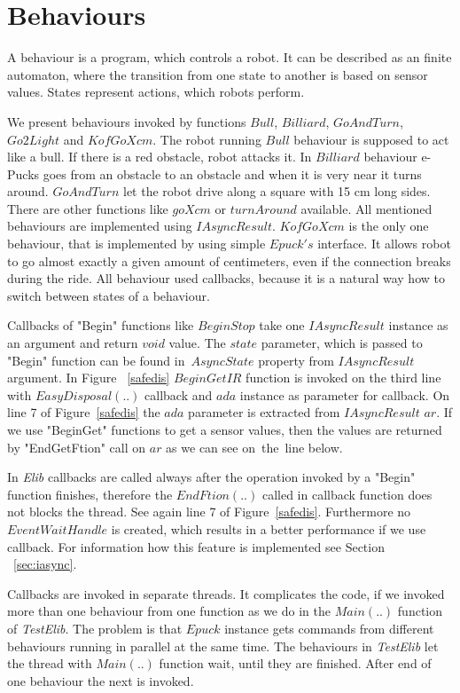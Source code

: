 \section{Behaviours} \label{sec:behaviours}
  A behaviour is a program, which controls a robot. It can be described as an finite automaton, 
  where the transition from one state to another is based on sensor values.
  States represent actions, which robots perform.
  
  We present behaviours invoked by functions $Bull$, $Billiard$, $GoAndTurn$, $Go2Light$ and $KofGoXcm$.
  The robot running $Bull$ behaviour is supposed to act like a bull. 
  If there is a red obstacle, robot attacks it. 
  In $Billiard$ behaviour e-Pucks goes from an obstacle to an obstacle
  and when it is very near it turns around.
  $GoAndTurn$ let the robot drive along a square with 15 cm long sides. 
  There are other functions like $goXcm$ or $turnAround$ available.
  All mentioned behaviours are implemented using $IAsyncResult$. 
  $KofGoXcm$ is the only one behaviour, that is implemented by using simple $Epuck's$ interface.
  It allows robot to go almost exactly a given amount of centimeters, even if the connection breaks during the ride.
  All behaviour used  callbacks, because it is a natural way how to switch between states of a behaviour.

  Callbacks of "Begin" functions like $BeginStop$ take one $IAsyncResult$ instance as an argument and return $void$ value.
  The $state$ parameter, which is passed to "Begin" function can be found 
  in~$AsyncState$ property from $IAsyncResult$ argument.
  In Figure ~\ref{safedis} $BeginGetIR$ function is invoked on the third line 
   with $EasyDisposal(..)$ callback 
  and $ada$ instance as parameter for callback.
  On line 7 of Figure~\ref{safedis} the $ada$ parameter is extracted from $IAsyncResult$ $ar$.
  If we use "BeginGet" functions to get a sensor values, 
  then the values are returned by "EndGetFtion" call on $ar$ as we can see on~the~line below.

  In {\it Elib} callbacks are called always after the operation invoked by a "Begin" function finishes, 
  therefore the $EndFtion(..)$ called in callback function does not blocks the thread.
  See again line 7 of Figure~\ref{safedis}.
  Furthermore no $EventWaitHandle$ is created, which results in a better performance if we use callback.
  For information how this feature is implemented see Section ~\ref{sec:iasync}.

  Callbacks are invoked in separate threads. It complicates the code, if we invoked more than one behaviour
  from one function as we do in the $Main(..)$ function of {\it TestElib}. 
  The problem is that $Epuck$ instance gets 
  commands from different behaviours running in parallel at the same time.
  The behaviours in {\it TestElib} let the thread with $Main(..)$ function wait, until they are finished.
  After end of one behaviour the next is invoked.
  
